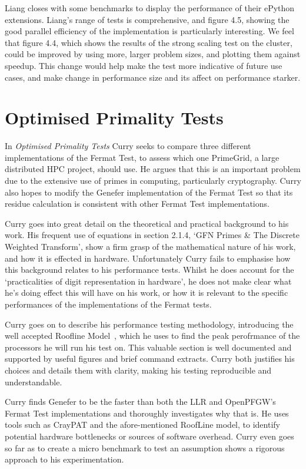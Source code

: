 \documentclass{report}[a4]
\begin{document}
 Liang closes with some benchmarks to display the performance of their ePython extensions. Liang's range of tests is comprehensive, and figure 4.5, showing the good parallel efficiency of the implementation is particularly interesting. We feel that figure 4.4, which shows the results of the strong scaling test on the cluster, could be improved by using more, larger problem sizes, and plotting them against speedup. This change would help make the test more indicative of future use cases, and make change in performance size and its affect on performance starker.

\section{Optimised Primality Tests}

In \textit{Optimised Primality Tests} Curry seeks to compare three different implementations of the Fermat Test, to assess which one PrimeGrid, a large distributed HPC project, should use. He argues that this is an important problem due to the extensive use of primes in computing, particularly cryptography. Curry also hopes to modify the Genefer implementation of the Fermat Test so that its residue calculation is consistent with other Fermat Test implementations.

Curry goes into great detail on the theoretical and practical background to his work. His frequent use of equations in section 2.1.4, `GFN Primes \& The Discrete Weighted Transform', show a firm grasp of the mathematical nature of his work, and how it is effected in hardware. Unfortunately Curry fails to emphasise how this background relates to his performance tests.  Whilst he does account for the `practicalities of digit representation in hardware', he does not make clear what he's doing effect this will have on his work, or how it is relevant to the specific performances of the implementations of the Fermat tests.

Curry goes on to describe his performance testing methodology, introducing the well accepted Roofline Model~\cite{williams2009, hennessy2011computer, asanovic2009view}, which he uses to find the peak perofrmance of the processors he will run his test on. This valuable section is well documented and supported by useful figures and brief command extracts. Curry both justifies his choices and details them with clarity, making his testing reproducible and understandable.

Curry finds Genefer to be the faster than both the LLR and OpenPFGW's Fermat Test implementations and thoroughly investigates why that is. He uses tools such as CrayPAT and the afore-mentioned RoofLine model, to identify potential hardware bottlenecks or sources of software overhead. Curry even goes so far as to create a micro benchmark to test an assumption shows a rigorous approach to his experimentation.
\end{document}
